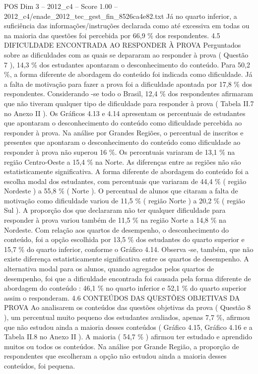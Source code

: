 \begin{textsample}{POS Dim 3 – 2012\_c4 – Score 1.00 – 2012\_c4/enade\_2012\_tec\_gest\_fin\_8526ca4e82.txt}
Já no quarto inferior, a suficiência das informações/instruções declarada como até excessiva em todas ou na maioria das questões foi percebida por 66,9 \% dos respondentes. 4.5 DIFICULDADE ENCONTRADA AO RESPONDER À PROVA Perguntados sobre as dificuldades com as quais se depararam ao responder à prova ( Questão 7 ), 14,3 \% dos estudantes apontaram o desconhecimento do conteúdo.
Para 50,2 \%, a forma diferente de abordagem do conteúdo foi indicada como dificuldade.
Já a falta de motivação para fazer a prova foi a dificuldade apontada por 17,8 \% dos respondentes.
Considerando -se todo o Brasil, 12,4 \% dos respondentes afirmaram que não tiveram qualquer tipo de dificuldade para responder à prova ( Tabela II.7 no Anexo II ).
Os Gráficos 4.13 e 4.14 apresentam os percentuais de estudantes que apontaram o desconhecimento do conteúdo como dificuldade percebida ao responder à prova.
Na análise por Grandes Regiões, o percentual de inscritos e presentes que apontaram o desconhecimento do conteúdo como dificuldade ao responder à prova não superou 16 \%.
Os percentuais variaram de 13,1 \% na região Centro-Oeste a 15,4 \% na Norte.
As diferenças entre as regiões não são estatisticamente significativa.
A forma diferente de abordagem do conteúdo foi a escolha modal dos estudantes, com percentuais que variaram de 44,4 \% ( região Nordeste ) a 55,8 \% ( Norte ).
O percentual de alunos que citaram a falta de motivação como dificuldade variou de 11,5 \% ( região Norte ) a 20,2 \% ( região Sul ).
A proporção dos que declararam não ter qualquer dificuldade para responder à prova variou também de 11,5 \% na região Norte a 14,8 \% na Nordeste.
Com relação aos quartos de desempenho, o desconhecimento do conteúdo, foi a opção escolhida por 13,5 \% dos estudantes do quarto superior e 15,7 \% do quarto inferior, conforme o Gráfico 4.14.
Observa -se, também, que não existe diferença estatisticamente significativa entre os quartos de desempenho.
A alternativa modal para os alunos, quando agregados pelos quartos de desempenho, foi que a dificuldade encontrada foi causada pela forma diferente de abordagem do conteúdo : 46,1 \% no quarto inferior e 52,1 \% do quarto superior assim o responderam. 4.6 CONTEÚDOS DAS QUESTÕES OBJETIVAS DA PROVA Ao analisarem os conteúdos das questões objetivas da prova ( Questão 8 ), um percentual muito pequeno dos estudantes avaliados, apenas 7,7 \%, afirmou que não estudou ainda a maioria desses conteúdos ( Gráfico 4.15, Gráfico 4.16 e a Tabela II.8 no Anexo II ).
A maioria ( 54,7 \% ) afirmou ter estudado e aprendido muitos ou todos os conteúdos.
Na análise por Grande Região, a proporção de respondentes que escolheram a opção não estudou ainda a maioria desses conteúdos, foi pequena.

\end{textsample}

